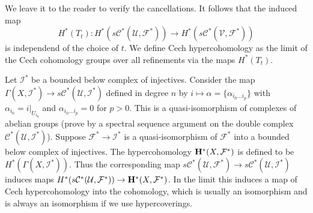 We leave it to the reader to verify the cancellations.
It follows that the induced map
$$
H^*(T_t) :
H^*(s{\mathcal C}^*({\mathcal U},{\mathcal F}^*)) \to
H^*(s{\mathcal C}^*({\mathcal V},{\mathcal F}^*))
$$
is independend of the choice of $t$. We define
Cech hypercohomology as the limit of the Cech cohomology groups
over all refinements via the maps $H^*(T_t)$.

\medskip\noindent
Let ${\mathcal I}^*$ be a bounded below complex of injectives. Consider
the map $\Gamma(X, {\mathcal I}^*) \to
s{\mathcal C}^*({\mathcal U}, {\mathcal I}^*)$ defined in degree $n$ by
$i \mapsto \alpha = \{\alpha_{i_0\ldots i_p}\}$ with
$\alpha_{i_0} = i|_{U_{i_0}}$ and $\alpha_{i_0\ldots i_p} = 0$
for $p>0$. This is a quasi-isomorphism of complexes of abelian groups
(prove by a spectral sequence argument on the double complex
${\mathcal C}^*({\mathcal U}, {\mathcal I}^*)$).
Suppose ${\mathcal F}^* \to {\mathcal I}^*$ is a quasi-isomorphism
of ${\mathcal F}^*$ into a bounded below complex of injectives. 
The hypercohomology ${\bf H}^*(X,{\mathcal F}^*)$ is defined 
to be $H^*(\Gamma(X, {\mathcal I}^*))$. Thus
the corresponding map $s{\mathcal C}^*({\mathcal U}, {\mathcal F}^*) \to 
s{\mathcal C}^*({\mathcal U}, {\mathcal I}^*)$ induces maps
$H^*(s{\mathcal C}^*({\mathcal U}, {\mathcal F}^*)) \to
{\bf H}^*(X,{\mathcal F}^*)$.
In the limit this induces a map of Cech hypercohomology into
the cohomology, which is usually an isomorphism and is always
an isomorphism if we use hypercoverings.

